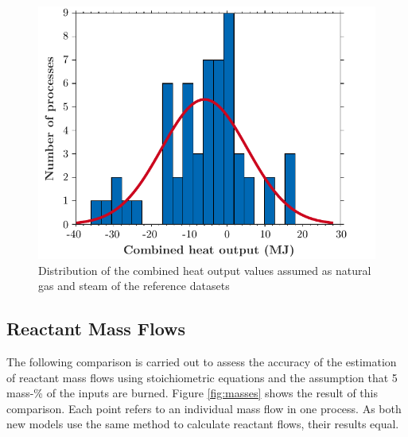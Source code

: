 \begin{figure}[htp!]
        \centering
        \includegraphics{images/histdist.pdf}
        \caption{Distribution of the combined heat output values assumed as natural gas and steam of the reference datasets}
        \label{fig:histogram}
\end{figure}


\subsection{Reactant Mass Flows}
The following comparison is carried out to assess the accuracy of the estimation of reactant mass flows using stoichiometric equations and the assumption that 5 mass-\% of the inputs are burned. Figure \ref{fig:masses} shows the result of this comparison. Each point refers to an individual mass flow in one process. As both new models use the same method to calculate reactant flows, their results equal.


